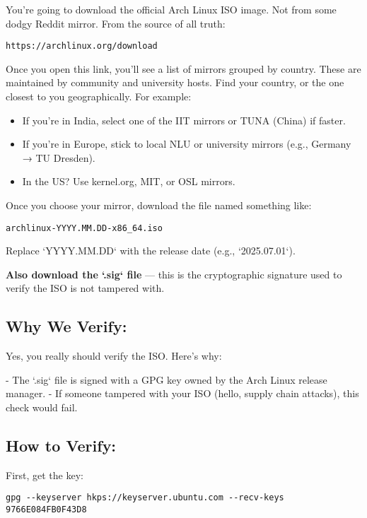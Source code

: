 \documentclass[12pt,openany]{book}
\begin{document}
You’re going to download the official Arch Linux ISO image. Not from some dodgy Reddit mirror. From the source of all truth:

\begin{lstlisting}
https://archlinux.org/download
\end{lstlisting}

Once you open this link, you’ll see a list of mirrors grouped by country. These are maintained by community and university hosts. Find your country, or the one closest to you geographically. For example:

\begin{itemize}
  \item If you're in India, select one of the IIT mirrors or TUNA (China) if faster.
  \item If you're in Europe, stick to local NLU or university mirrors (e.g., Germany → TU Dresden).
  \item In the US? Use kernel.org, MIT, or OSL mirrors.
\end{itemize}

Once you choose your mirror, download the file named something like:

\begin{lstlisting}
archlinux-YYYY.MM.DD-x86_64.iso
\end{lstlisting}

Replace `YYYY.MM.DD` with the release date (e.g., `2025.07.01`).

\textbf{Also download the `.sig` file} — this is the cryptographic signature used to verify the ISO is not tampered with.

\subsection*{Why We Verify:}

Yes, you really should verify the ISO. Here's why:

- The `.sig` file is signed with a GPG key owned by the Arch Linux release manager.
- If someone tampered with your ISO (hello, supply chain attacks), this check would fail.

\subsection*{How to Verify:}

First, get the key:
\begin{lstlisting}
gpg --keyserver hkps://keyserver.ubuntu.com --recv-keys 9766E084FB0F43D8
\end{lstlisting}
\end{document}
